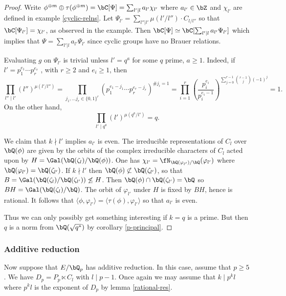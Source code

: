 \begin{proof}
    Write $\phi^{\oplus m} \oplus \tau(\phi^{\oplus m}) = \bC[\Psi] = \sum_{l' \mid l}{a_{l'}} \chi_{l'}$ where $a_{l'} \in \bZ$ and $\chi_{l'}$ are defined in example \ref{cyclic-relns}. Let $\Psi_{l'} = \sum_{l'' | l'}\mu(l' / l'')\cdot C_{l / l''}$ so that $\bC[\Psi_{l'}] = \chi_{l'}$, as observed in the example. Then $\bC[\Psi] \simeq \bC[\sum_{l' | l } a_{l'} \Psi_{l'}]$ which implies that $\Psi = \sum_{l' | l } a_{l'} \Psi_{l'}$ since cyclic groups have no Brauer relations.

    Evaluating $g$ on $\Psi_{l'}$ is trivial unless $l' = q^a$ for some $q$ prime, $a \geq 1$. Indeed, if $l' = p_1^{e_1} \cdots p_r^{e_r}$ , with $r \geq 2$ and $e_i \geq 1$, then
    \[ \prod_{l'' \mid l'} (l'')^{\mu(l' / l'')} = \prod_{j_1, \ldots j_r \in \{0,1\}^r } \left(p_1^{e_1 - j_1} \cdots p_r^{e_r - j_r}\right)^{\# j_i = 1} = \prod_{i = 1}^r \left(\frac{p_i^{e_i}}{p_i^{e_i - 1}}\right)^{\sum_{ j = 0}^{r - 1} \binom{r-1}{j} (-1)^j} = 1. \]
    On the other hand,
    \[ \prod_{l' \mid q^a} (l')^{\mu(q^a / l')} = q .\]
    
    We claim that $k \nmid l'$ implies $a_{l'}$ is even. The irreducible representations of $C_l$ over $\bQ(\phi)$ are given by the orbits of the complex irreducible characters of $C_l$ acted upon by $H = \Gal (\bQ(\zeta_l) / \bQ(\phi))$. One has $\chi_{l'} = \repnorm{\varphi_{l'}}$ where $\bQ(\varphi_{l'}) = \bQ(\zeta_{l'})$. If $ k \nmid l'$ then $\bQ(\phi) \not\subset \bQ(\zeta_{l'})$, so that $B = \Gal(\bQ(\zeta_l) / \bQ(\zeta_{l'})) \not\leq H$. Then $\bQ(\phi) \cap \bQ(\zeta_{l'}) = \bQ$ so $BH = \Gal(\bQ(\zeta_l) / \bQ)$. The orbit of $\varphi_{l'}$ under $H$ is fixed by $BH$, hence is rational. It follows that $\langle \phi, \varphi_{l'} \rangle = \langle \tau(\phi) , \varphi_{l'} \rangle$ so that $a_{l'}$ is even.  

    Thus we can only possibly get something interesting if $k = q$ is a prime. But then $q$ is a norm from $\bQ(\sqrt{q^*})$ by corollary \ref{p-principal}. 
\end{proof}

\subsubsection*{Additive reduction}

Now suppose that $E / \bQ_p$ has additive reduction. In this case, assume that $p \geq 5$. We have $D_p = P_p \ltimes C_l$ with $ l \mid p - 1$.  
Once again we may assume that $k \mid p^k l$ where $p^k l $ is the exponent of $D_p$ by lemma \ref{rational-res}.


